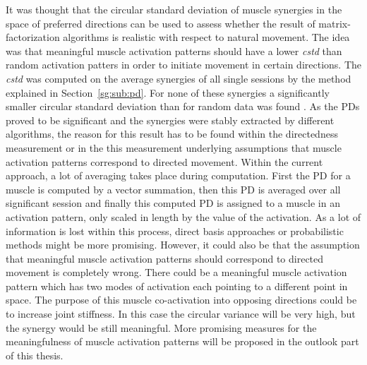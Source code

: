 It was thought that the circular standard deviation of muscle synergies in the space of preferred directions can be used to assess whether the result of matrix-factorization
algorithms is realistic with respect to natural movement. The idea was that meaningful muscle activation patterns should have a lower \emph{cstd} than random activation patters in order to initiate movement in certain directions. The \emph{cstd} was computed on the average synergies of all single sessions by the method explained in Section~\ref{sg:sub:pd}. For none of these synergies a significantly smaller circular standard deviation than for random data was found .
As the PDs proved to be significant and the synergies were stably extracted by different algorithms, the reason for this result has to be found within the directedness measurement or in the this measurement underlying assumptions that muscle activation patterns correspond to directed movement. Within the current approach, a lot of averaging takes place during computation. First the PD for a muscle is computed by a vector summation, then this PD is averaged over all significant session
and finally this computed PD is assigned to a muscle in an activation pattern,
only scaled in length by the value of the activation. As a lot of information is lost within this process,
direct basis approaches or probabilistic methods might be more promising.
However, it could also be that the assumption that meaningful muscle activation patterns should correspond to
directed movement is completely wrong. There could be a meaningful muscle activation pattern
which has two modes of activation each pointing to a different point in space.
The purpose of this muscle co-activation into opposing directions could be to increase
joint stiffness. In this case the circular variance will be very high, but the synergy would be still meaningful. 
More promising measures for the meaningfulness of muscle activation patterns will be proposed in the outlook part
of this thesis.
